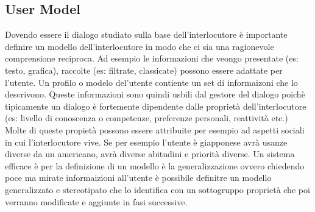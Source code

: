 \documentclass{thesisreport}
\begin{document}
 \subsection{User Model}
 Dovendo essere il dialogo studiato sulla base dell'interlocutore è importante definire un modello dell'interlocutore in modo che ci sia una ragionevole comprensione reciproca. Ad esempio le informazioni che veongo presentate (es: testo, grafica), raccolte (es: filtrate, classicate) possono essere adattate per l'utente. Un profilo o modelo del'utente contiente un set di informaizoni che lo descrivono. Queste informazioni sono quindi usbili dal gestore del dialogo poichè tipicamente un dialogo è fortemente dipendente dalle proprietà dell'interlocutore (es: livello di conoscenza o competenze, preferenze personali, reattività etc.)
 Molte di queste propietà possono essere attribuite per esempio ad aspetti sociali in cui l'interlocutore vive. Se per esempio l'utente è giapponese avrà usanze diverse da un americano, avrà diverse abitudini e priorità diverse. Un sistema efficace è per la definizione di un modello è la generalizzazione ovvero chiedendo poce ma mirate informaizioni all'utente è possibile definitre un modello generalizzato e stereotipato che lo identifica con un sottogruppo proprietà che poi verranno modificate e aggiunte in fasi successive.
 

  
 
 
 
 
 
\end{document}
